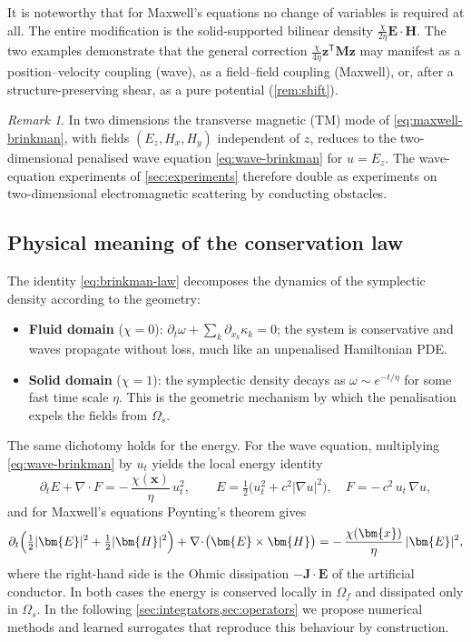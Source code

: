 \documentclass[11pt]{article}
\theoremstyle{definition}
\theoremstyle{remark}
\newtheorem{remark}[theorem]{Remark}
\newcommand{\bz}{\bm{z}}
\newcommand{\bx}{\bm{x}}
\newcommand{\bE}{\bm{E}}
\newcommand{\bH}{\bm{H}}
\newcommand{\bM}{\bm{M}}
\newcommand{\chixx}{\chi(\bx)}
\begin{document}
It is noteworthy that for Maxwell's equations no change of
variables is required at all. The entire modification is the
solid-supported bilinear density $\frac{\chi}{2\eta}\bE\cdot\bH$.  The
two examples demonstrate that the
general correction $\frac{\chi}{4\eta}\bz^{\mathsf T}\bM\bz$ may
manifest as a position--velocity coupling (wave), as a field--field
coupling (Maxwell), or, after a structure-preserving shear, as a pure
potential (\cref{rem:shift}).

\begin{remark}
\label{rem:tm}
In two dimensions the transverse magnetic (TM) mode of
\eqref{eq:maxwell-brinkman}, with fields $(E_z,H_x,H_y)$ independent
of $z$, reduces to the two-dimensional penalised wave equation
\eqref{eq:wave-brinkman} for $u=E_z$.  The wave-equation experiments
of \cref{sec:experiments} therefore double as experiments on
two-dimensional electromagnetic scattering by conducting obstacles.
\end{remark}

\subsection{Physical meaning of the conservation law}
\label{subsec:physical}

The identity \eqref{eq:brinkman-law} decomposes the dynamics of the
symplectic density according to the geometry:
\begin{itemize}[leftmargin=2em]
\item \textbf{Fluid domain} ($\chi=0$):
$\partial_t\omega+\sum_k\partial_{x_k}\kappa_k=0$; the system is
conservative and waves propagate without loss, much like an
unpenalised Hamiltonian PDE.
\item \textbf{Solid domain} ($\chi=1$): the symplectic density decays
as $\omega\sim e^{-t/\eta}$ for some
fast time scale $\eta$. This is the geometric mechanism by which the
penalisation expels the fields from $\Omega_s$.
\end{itemize}
The same dichotomy holds for the energy.  For the wave equation,
multiplying \eqref{eq:wave-brinkman} by $u_t$ yields the local energy
identity
\begin{equation}
\label{eq:energy-identity}
\partial_t E + \nabla\!\cdot\!F = -\,\frac{\chixx}{\eta}\,u_t^2,
\qquad
E=\tfrac12\bigl(u_t^2 + c^2|\nabla u|^2\bigr),
\quad
F = -\,c^2\,u_t\,\nabla u ,
\end{equation}
and for Maxwell's equations Poynting's theorem gives
\begin{equation}
\label{eq:poynting}
\partial_t\Bigl(\tfrac12|\bE|^2+\tfrac12|\bH|^2\Bigr)
+ \nabla\!\cdot\!\bigl(\bE\times\bH\bigr)
= -\,\frac{\chixx}{\eta}\,|\bE|^2 ,
\end{equation}
where the right-hand side is the Ohmic dissipation
$-\bm{J}\cdot\bE$ of the artificial conductor.  In both cases the
energy is conserved locally in $\Omega_f$ and dissipated only in
$\Omega_s$.  In the following \cref{sec:integrators,sec:operators} we propose numerical methods and learned surrogates that reproduce
this behaviour by construction. 
\end{document}

